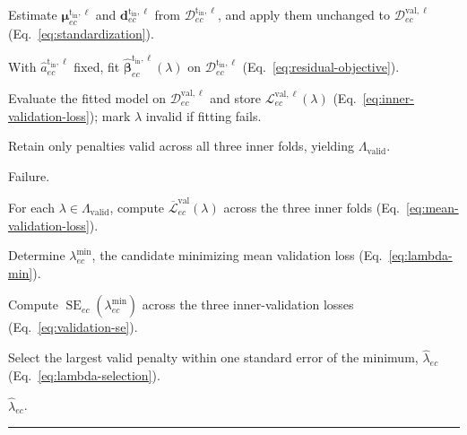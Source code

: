 \documentclass[11pt,a4paper]{article}
\begin{document}
\begin{landscape}
\begin{table}[p]
\begin{algorithmic}[1]
        \State Estimate
        $\boldsymbol\mu_{ec}^{\mathrm{t_{in}},\ell}$ and
        $\mathbf d_{ec}^{\mathrm{t_{in}},\ell}$
        from $\mathcal D_{ec}^{\mathrm{t_{in}},\ell}$,
        and apply them unchanged to
        $\mathcal D_{ec}^{\mathrm{val},\ell}$
        (Eq.~\ref{eq:standardization}).


            \State With
            $\widehat a_{ec}^{\mathrm{t_{in}},\ell}$ fixed, fit
            $\widehat{\boldsymbol\beta}_{ec}^{\mathrm{t_{in}},\ell}
            (\lambda)$
            on $\mathcal D_{ec}^{\mathrm{t_{in}},\ell}$
            (Eq.~\ref{eq:residual-objective}).

            \State Evaluate the fitted model on
            $\mathcal D_{ec}^{\mathrm{val},\ell}$ and store
            $\mathcal L_{ec}^{\mathrm{val},\ell}(\lambda)$
            (Eq.~\ref{eq:inner-validation-loss});
            mark $\lambda$ invalid if fitting fails.

        \EndFor

    \EndFor

    \State Retain only penalties valid across all three inner folds,
    yielding $\Lambda_{\mathrm{valid}}$.

        \State \Return Failure.
    \EndIf

    \State For each $\lambda\in\Lambda_{\mathrm{valid}}$, compute
    $\overline{\mathcal L}_{ec}^{\mathrm{val}}(\lambda)$
    across the three inner folds
    (Eq.~\ref{eq:mean-validation-loss}).

    \State Determine
    $\lambda_{ec}^{\min}$,
    the candidate minimizing mean validation loss
    (Eq.~\ref{eq:lambda-min}).

    \State Compute
    $\operatorname{SE}_{ec}(\lambda_{ec}^{\min})$
    across the three inner-validation losses
    (Eq.~\ref{eq:validation-se}).

    \State Select the largest valid penalty within one standard error
    of the minimum,
    $\widehat\lambda_{ec}$
    (Eq.~\ref{eq:lambda-selection}).

    \State \Return $\widehat\lambda_{ec}$.

\EndFunction

\end{algorithmic}

\par\nobreak\noindent\rule{\linewidth}{0.8pt}

\end{table}
\endgroup
\end{landscape}
\end{document}
